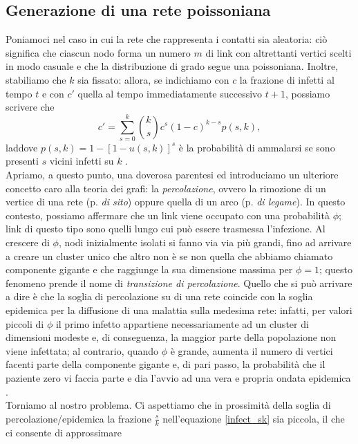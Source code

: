 \subsection{Generazione di una rete poissoniana}
Poniamoci nel caso in cui la rete che rappresenta i contatti sia aleatoria: ciò significa che ciascun nodo forma un numero $ m $ di link con altrettanti vertici scelti in modo casuale e che la distribuzione di grado segue una poissoniana. Inoltre, stabiliamo che $ k $ sia fissato: allora, se indichiamo con $ c $ la frazione di infetti al tempo $ t $ e con $ c' $ quella al tempo immediatamente successivo $ t + 1 $, possiamo scrivere che
\begin{equation}
c' = \sum_{s = 0}^k \binom{k}{s}c^s \left(1-c \right)^{k-s} p\left(s,k \right),
\end{equation}
laddove $ p\left(s,k \right) = 1 - \left[1 - u \left(s,k \right) \right]^s$ è la probabilità di ammalarsi se sono presenti $ s $ vicini infetti su $ k $ \cite{Bagnoli2014}. 
\medskip
\\Apriamo, a questo punto, una doverosa parentesi ed introduciamo un ulteriore concetto caro alla teoria dei grafi: la \emph{percolazione}, ovvero la rimozione di un vertice di una rete (p. \emph{di sito}) oppure quella di un arco (p. \emph{di legame}). In questo contesto, possiamo affermare che un link viene occupato con una probabilità $ \phi $; link di questo tipo sono quelli lungo cui può essere trasmessa l'infezione. Al crescere di  $ \phi $, nodi inizialmente isolati si fanno via via più grandi, fino ad arrivare a creare un cluster unico  che altro non è se non quella che abbiamo chiamato componente gigante e che raggiunge la sua dimensione massima per $ \phi = 1 $; questo fenomeno prende il nome di \emph{transizione di percolazione}. Quello che si può arrivare a dire è che la soglia di percolazione su di una rete coincide con la soglia epidemica per la diffusione di una malattia sulla medesima rete: infatti, per valori piccoli di $ \phi $ il primo infetto appartiene necessariamente ad un cluster di dimensioni modeste e, di conseguenza, la maggior parte della popolazione non viene infettata; al contrario, quando $ \phi $ è grande, aumenta il numero di vertici facenti parte della componente gigante e, di pari passo, la probabilità che il paziente zero vi faccia parte e dia l'avvio ad una vera e propria ondata epidemica \cite{Newman}.
\medskip
\\Torniamo al nostro problema. Ci aspettiamo che in prossimità della soglia di percolazione/epidemica la frazione $ \tfrac{s}{k} $ nell'equazione \eqref{infect_sk} sia piccola, il che ci consente di approssimare
